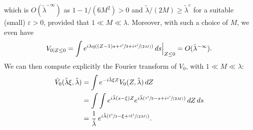 \documentclass[JEP,XML,SOM,Unicode,NoEqCountersInSection,NoFloatCountersInSection,published]{cedram}
\newcommand{\spfrac}[2]{\sfrac{#1}{(#2)}}
\theoremstyle{plain}
\theoremstyle{definition}
\begin{document}
which is $O(\tilde \lambda^{-\infty})$ as $1-1/(6M^{2})>0$ and $\tilde \lambda /(2M) \geq \tilde \lambda^{\varepsilon}$ for a suitable (small) $\varepsilon>0$, provided that $1\ll M\ll \lambda$. Moreover, with such a choice of $M$, we even have
\begin{equation}
\label{eq:Zneg}
V_{0|{Z}\leq 0}=\int e^{i\lambda \eta(({Z}-1) s+\sfrac {s^{3}} 3 +i \spfrac {s^{2}}{2M})} \,ds\Big|_{{Z}\leq 0}=O(\tilde \lambda^{-\infty}).
\end{equation}
We can then compute explicitly the Fourier transform of $V_0$, with $1\ll M\ll \lambda $:
\begin{equation}
\label{eq:55}
\begin{split}
\hat V_{0} (\tilde\lambda \xi,\tilde\lambda) & = \int e^{-i\tilde\lambda \xi {Z} }V_0({Z},\tilde\lambda)\,dZ \\
& =\int \int e^{i\tilde\lambda (s-\xi){Z}} e^{i\tilde\lambda (\sfrac {s^{3}} 3 -s +i \spfrac {s^{2}}{2M})} \,dZ \,ds \\
& =\frac 1 {\tilde\lambda}\, e^{i\tilde\lambda (\sfrac{\xi^{3}}3-\xi+\spfrac {i \xi^{2}}{2M})}.
\end{split}
\end{equation}
\end{document}
